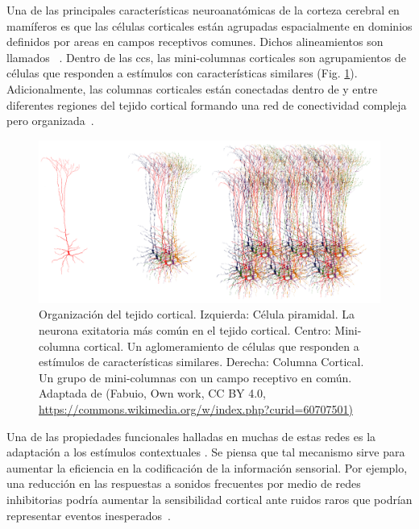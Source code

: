 {Una de las principales características neuroanatómicas de la corteza cerebral en mamíferos es que las células corticales están agrupadas espacialmente en dominios definidos por areas en campos receptivos comunes. Dichos alineamientos son llamados ~\cite{mountcastle_1955, mountcastle_1957, hubel_1962, hubel_1968}. Dentro de las \glspl{cc}, las mini-columnas corticales son agrupamientos de células que responden a estímulos con características similares (Fig. \ref{fig:Biological}). Adicionalmente, las columnas corticales están conectadas dentro de y entre diferentes regiones del tejido cortical formando una red de conectividad compleja pero organizada~\cite{mountcastle_1997}.

\begin{figure}[h!]
    \centering
    \includegraphics[width=1.0\textwidth]{Biological.png}
    \caption{Organización del tejido cortical. Izquierda: Célula piramidal. La neurona exitatoria más común en el tejido cortical.
	    Centro: Mini-columna cortical. Un aglomeramiento de células que responden a estímulos de características similares.
	    Derecha: Columna Cortical. Un grupo de mini-columnas con un campo receptivo en común.
	    Adaptada de (Fabuio, Own work, CC BY 4.0, \url{https://commons.wikimedia.org/w/index.php?curid=60707501)}}
    \label{fig:Biological}
\end{figure}

Una de las propiedades funcionales halladas en muchas de estas redes es la adaptación a los estímulos contextuales \cite{KRAUSE201436,doi:10.1167/16.13.1}. Se piensa que tal mecanismo sirve para aumentar la eficiencia en la codificación de la información sensorial. Por ejemplo, una reducción en las respuestas a sonidos frecuentes por medio de redes inhibitorias podría aumentar la sensibilidad cortical ante ruidos raros que podrían representar eventos inesperados~\cite{Natan2015ComplementaryCO,nachum_2003,Javitt11962}.

}
